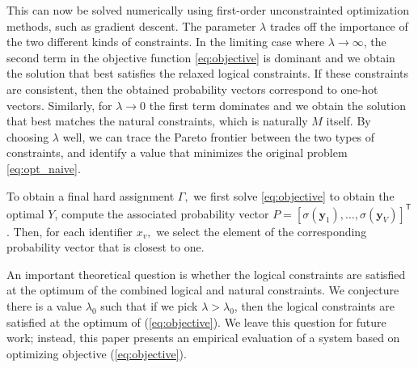 \documentclass[sigplan,10pt,review,anonymous]{acmart} %
\newcommand{\qqpi}[2]{[\![#2]\!]_{#1}}
\theoremstyle{plain}
\theoremstyle{remark}
\theoremstyle{definition}
\begin{document}
This can now be solved numerically using first-order unconstrainted optimization methods, such as gradient descent.
The parameter $\lambda$ trades off the importance
of the two different kinds of constraints.
In the limiting case where $\lambda \rightarrow \infty$, the second term in the objective function \eqref{eq:objective} is dominant and we obtain the solution that best satisfies the relaxed
logical constraints.
If these constraints are consistent, then the obtained probability vectors correspond to one-hot vectors.
Similarly, for $\lambda \rightarrow 0$ the first term dominates and we obtain the solution that best matches the natural constraints,
which is naturally $M$ itself. By choosing $\lambda$ well,
we can trace the Pareto frontier between the two types of constraints,
and identify a value that minimizes the original problem \eqref{eq:opt_naive}.

To obtain a final hard assignment $\Gamma,$ we first solve \eqref{eq:objective} to obtain the optimal $Y$, compute the
associated probability vector $P = [\sigma(\bm{y}_1), \ldots, \sigma(\bm{y}_{V})]^\mathsf{T}$. Then, for each identifier $x_v,$
we select the element of the
corresponding probability vector that is closest to one.

An important theoretical question is whether the logical constraints are satisfied at the optimum
of the combined logical and natural constraints.
We conjecture there is a value $\lambda_0$ such that if we pick $\lambda > \lambda_0$,
then the logical constraints are satisfied at the optimum of (\ref{eq:objective}).
We leave this question for future work; instead, this paper presents an empirical evaluation
of a system based on optimizing objective (\ref{eq:objective}).

\end{document}
